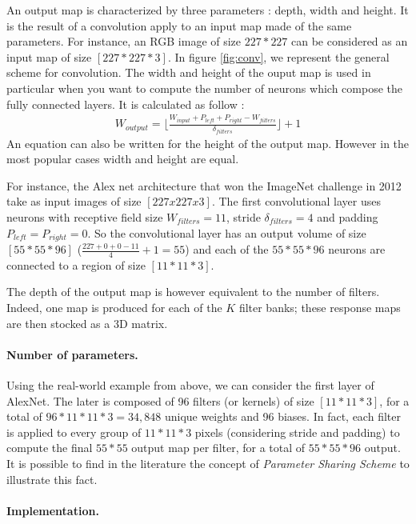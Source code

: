 An output map is characterized by three parameters : depth, width and height. It is the result of a convolution apply to an input map made of the same parameters. For instance, an RGB image of size $227*227$ can be considered as an input map of size $[227*227*3]$.
In figure \ref{fig:conv}, we represent the general scheme for convolution. 
The width and height of the ouput map is used in particular when you want to compute the number of neurons which compose the fully connected layers. It is calculated as follow : 
\begin{align}
 W_{output} = \lfloor \frac{W_{input} + P_{left} + P_{right} - W_{filters}}{\delta_{filters}} \rfloor + 1 \nonumber
\end{align}
An equation can also be written for the height of the output map. However in the most popular cases width and height are equal.

For instance, the Alex net architecture that won the ImageNet challenge in 2012 take as input images of size $[227x227x3]$. The first convolutional layer uses neurons with receptive field size $W_{filters} = 11$, stride $\delta_{filters} = 4$ and padding $P_{left} = P_{right} = 0$. So the convolutional layer has an output volume of size $[55*55*96]$ ($\frac{227 + 0 + 0 - 11}{4} + 1 = 55$) and each of the $55*55*96$ neurons are connected to a region of size $[11*11*3]$.

The depth of the output map is however equivalent to the number of filters. Indeed, one map is produced for each of the $K$ filter banks; these response maps are then stocked as a 3D matrix.


\paragraph{Number of parameters. }

Using the real-world example from above, we can consider the first layer of AlexNet. The later is composed of 96 filters (or kernels) of size $[11*11*3]$, for a total of $96*11*11*3 = 34,848$ unique weights and 96 biases. In fact, each filter is applied to every group of $11*11*3$ pixels (considering stride and padding) to compute the final $55*55$ output map per filter, for a total of $55*55*96$ output. It is possible to find in the literature the concept of \textit{Parameter Sharing Scheme} to illustrate this fact.


\paragraph{Implementation. }

